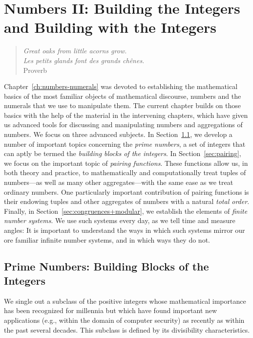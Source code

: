 
\chapter{Numbers II:
Building the Integers and Building with the Integers}
\label{ch:numbers-advanced}

\begin{quote}
{\em Great oaks from little acorns grow.} \\
{\em Les petits glands font des grands ch\^enes.} \\
\hspace*{2in}Proverb
\end{quote}

Chapter~\ref{ch:numbers-numerals} was devoted to establishing the
mathematical basics of the most familiar objects of mathematical
discourse, numbers and the numerals that we use to manipulate them.
The current chapter builds on those basics with the help of the
material in the intervening chapters, which have given us advanced
tools for discussing and manipulating numbers and aggregations of
numbers.  We focus on three advanced subjects.  In
Section~\ref{sec:primes}, we develop a number of important topics
concerning the {\em prime numbers}, a set of integers that can aptly
be termed the {\it building blocks of the integers}.  In
Section~\ref{sec:pairing}, we focus on the important topic of {\it
  pairing functions}.  These functions allow us, in both theory and
practice, to mathematically and computationally treat tuples of
 numbers---as well as many other aggregates---with
the same ease as we treat ordinary numbers.  One particularly
important contribution of pairing functions is their endowing tuples
and other aggregates of numbers with a natural {\em total order}.
Finally, in Section~\ref{sec:congruences+modular}, we establish the
elements of {\em finite number systems}.  We use such systems every
day, as we tell time and measure angles: It is important to understand
the ways in which such systems mirror our ore familiar infinite number
systems, and in which ways they do not.


\section{Prime Numbers: Building Blocks of the Integers}
\label{sec:primes}

We single out a subclass of the positive integers whose mathematical
importance has been recognized for millennia but which have found
important new applications (e.g., within the domain of computer
security) as recently as within the past several decades.  This
subclass is defined by its divisibility characteristics.

